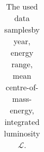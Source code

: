 {\begin{table}[htbp]
\begin{tabular}{|c|c|c|c|}
\hline
\end{tabular}
\caption{The used data samplesby year, energy range, mean centre-of-mass-energy, integrated luminosity ${\mathcal L}$.}
\label{tab:luminocity}
\end{table}
}




\newcommand{\TABmontecarlo}{
\begin{table}[htbp]\centering
\begin{tabular}{|c|c|c|c|}\hline
            & Luminocity and process.        &        &       \\
Energy      &  Pythia & Herwig & KoralW\\\hline\hline
130 & $e^+e^-\rightarrow Z\rightarrow \mathrm{hadrons}$ &  & \\
    &                                                   &  & \\
\hline
\end{tabular}
\caption{
A summary on the used samples.
}
\label{tab:montecarlo}
\end{table}
}





